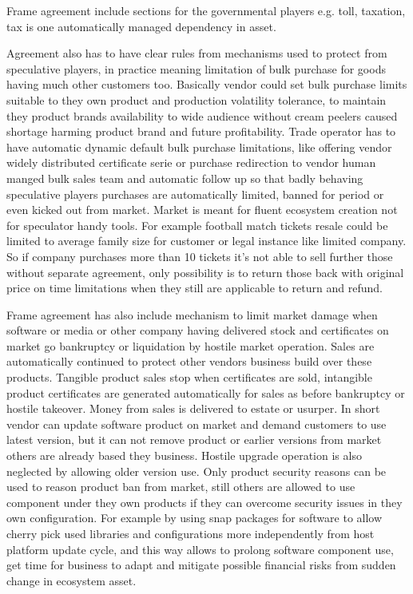 Frame agreement include sections for the governmental players e.g. toll,
taxation, tax is one automatically managed dependency in asset.

Agreement also has to have clear rules from mechanisms used to protect from
speculative players, in practice meaning limitation of bulk purchase for goods
having much other customers too. Basically vendor could set bulk purchase
limits suitable to they own product and production volatility tolerance, to
maintain they product brands availability to wide audience without cream
peelers caused shortage harming product brand and future profitability.
Trade operator has to have automatic dynamic default bulk purchase
limitations, like offering vendor widely distributed certificate serie or
purchase redirection to vendor human manged bulk sales team and automatic
follow up so that badly behaving speculative players purchases are
automatically limited, banned for period or even kicked out from market.
Market is meant for fluent ecosystem creation not for speculator handy
tools. For example football match tickets resale could be limited to
average family size for customer or legal instance like limited company.
So if company purchases more than 10 tickets it's not able to sell further
those without separate agreement, only possibility is to return those back
with original price on time limitations when they still are applicable to
return and refund. 

Frame agreement has also include mechanism to limit market damage when
software or media or other company having delivered stock and certificates on
market go bankruptcy or liquidation by hostile market operation. Sales are
automatically continued to protect other vendors business build over these
products. Tangible product sales stop when certificates are sold, intangible
product certificates are generated automatically for sales as before
bankruptcy or hostile takeover. Money from sales is delivered to estate or
usurper. In short vendor can update software product on market and demand
customers to use latest version, but it can not remove product or earlier
versions from market others are already based they business. Hostile upgrade
operation is also neglected by allowing older version use. Only product
security reasons can be used to reason product ban from market, still others
are allowed to use component under they own products if they can overcome
security issues in they own configuration. For example by using snap packages
for software to allow cherry pick used libraries and configurations more
independently from host platform update cycle, and this way allows to prolong
software component use, get time for business to adapt and mitigate possible
financial risks from sudden change in ecosystem asset.

